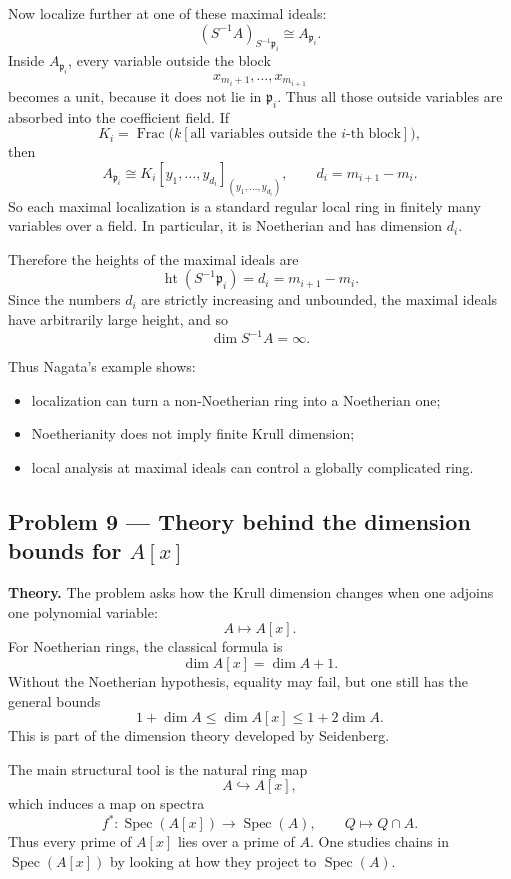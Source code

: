 \documentclass[12pt,a4paper]{article}
\theoremstyle{plain}
\theoremstyle{definition}      %
\begin{document}
\medskip

Now localize further at one of these maximal ideals:
\[
(S^{-1}A)_{S^{-1}\mathfrak p_i}\cong A_{\mathfrak p_i}.
\]
Inside \(A_{\mathfrak p_i}\), every variable outside the block
\[
x_{m_i+1},\dots,x_{m_{i+1}}
\]
becomes a unit, because it does not lie in \(\mathfrak p_i\). Thus all those outside variables are absorbed into the coefficient field. If
\[
K_i=\operatorname{Frac}\big(k[\text{all variables outside the }i\text{-th block}]\big),
\]
then
\[
A_{\mathfrak p_i}\cong K_i[y_1,\dots,y_{d_i}]_{(y_1,\dots,y_{d_i})},
\qquad d_i=m_{i+1}-m_i.
\]
So each maximal localization is a standard regular local ring in finitely many variables over a field. In particular, it is Noetherian and has dimension \(d_i\).

\medskip

Therefore the heights of the maximal ideals are
\[
\operatorname{ht}(S^{-1}\mathfrak p_i)=d_i=m_{i+1}-m_i.
\]
Since the numbers \(d_i\) are strictly increasing and unbounded, the maximal ideals have arbitrarily large height, and so
\[
\dim S^{-1}A=\infty.
\]

Thus Nagata's example shows:
\begin{itemize}
	\item localization can turn a non-Noetherian ring into a Noetherian one;
	\item Noetherianity does not imply finite Krull dimension;
	\item local analysis at maximal ideals can control a globally complicated ring.
\end{itemize}

\subsection*{Problem 9 --- Theory behind the dimension bounds for \(A[x]\)}

\textbf{Theory.}
The problem asks how the Krull dimension changes when one adjoins one polynomial variable:
\[
A \longmapsto A[x].
\]
For Noetherian rings, the classical formula is
\[
\dim A[x]=\dim A+1.
\]
Without the Noetherian hypothesis, equality may fail, but one still has the general bounds
\[
1+\dim A\le \dim A[x]\le 1+2\dim A.
\]
This is part of the dimension theory developed by Seidenberg.

\medskip

The main structural tool is the natural ring map
\[
A\hookrightarrow A[x],
\]
which induces a map on spectra
\[
f^*:\operatorname{Spec}(A[x])\to \operatorname{Spec}(A),
\qquad
Q\mapsto Q\cap A.
\]
Thus every prime of \(A[x]\) lies over a prime of \(A\). One studies chains in \(\operatorname{Spec}(A[x])\) by looking at how they project to \(\operatorname{Spec}(A)\).
\end{document}
